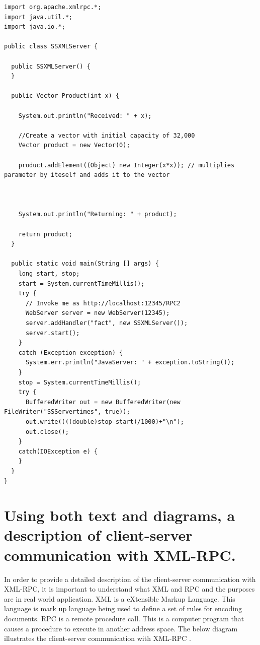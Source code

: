 \documentclass{article}
\begin{document}
\begin{lstlisting}
import org.apache.xmlrpc.*;
import java.util.*;
import java.io.*;

public class SSXMLServer {

  public SSXMLServer() {
  }

  public Vector Product(int x) {

    System.out.println("Received: " + x);

    //Create a vector with initial capacity of 32,000
    Vector product = new Vector(0);

    product.addElement((Object) new Integer(x*x)); // multiplies parameter by iteself and adds it to the vector
      
    

    System.out.println("Returning: " + product);

    return product;
  }

  public static void main(String [] args) {
    long start, stop;
    start = System.currentTimeMillis();
    try {
      // Invoke me as http://localhost:12345/RPC2
      WebServer server = new WebServer(12345);
      server.addHandler("fact", new SSXMLServer());
      server.start();
    }
    catch (Exception exception) {
      System.err.println("JavaServer: " + exception.toString());
    }
    stop = System.currentTimeMillis();
    try {
      BufferedWriter out = new BufferedWriter(new FileWriter("SSServertimes", true));
      out.write((((double)stop-start)/1000)+"\n");
      out.close();
    }
    catch(IOException e) {
    }
  }
}
\end{lstlisting}

\section{Using both text and diagrams, a description of client-server communication with XML-RPC.}


In order to provide a detailed description of the client-server communication with XML-RPC, it is important to understand what XML and RPC and the purposes are in real world application. XML is a eXtensible Markup Language. This language is mark up language being used to define a set of rules for encoding documents. RPC is a remote procedure call. This is a computer program that causes a procedure to execute in another address space. The below diagram illustrates the client-server communication with XML-RPC \cite{tanenbaum_steen_2007}.  
\end{document}
